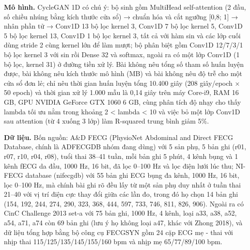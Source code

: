 \documentclass[12pt,a4paper]{article}
\begin{document}
\noindent \textbf{Mô hình.} CycleGAN 1D có chú ý: bộ sinh gồm MultiHead self-attention (2 đầu, số chiều nhúng bằng kích thước cửa sổ) → chuẩn hóa và cắt ngưỡng [0,8; 1] → nhân phần tử → Conv1D 13 bộ lọc kernel 3, Conv1D 7 bộ lọc kernel 5, Conv1D 5 bộ lọc kernel 13, Conv1D 1 bộ lọc kernel 3, tất cả với hàm sin và các lớp cuối dùng stride 2 cùng kernel lớn để làm mượt; bộ phân biệt gồm Conv1D 12/7/3/1 bộ lọc kernel 3 với sin rồi Dense 32 và softmax, ngoài ra có một lớp Conv1D (1 bộ lọc, kernel 31) ở đường tiền xử lý. Bài không nêu tổng số tham số huấn luyện được, bài không nêu kích thước mô hình (MB) và bài không nêu độ trễ cho một cửa sổ đơn lẻ; chỉ nêu thời gian huấn luyện tổng 10.400 giây (208 giây/epoch × 50 epoch) và thời gian xử lý 1.000 mẫu là 0,14 giây trên máy Core-i9, RAM 16 GB, GPU NVIDIA GeForce GTX 1060 6 GB, cùng phân tích độ nhạy cho thấy lambda tối ưu nằm trong khoảng 2 < lambda < 10 và việc bỏ một lớp Conv1D sau attention (từ 4 xuống 3 lớp) làm R-squared trung bình giảm 5\%.\par\vspace{3pt}
\noindent \textbf{Dữ liệu.} Bốn nguồn: A\&D FECG (PhysioNet Abdominal and Direct FECG Database, chính là ADFECGDB nhóm đang dùng) với 5 sản phụ, 5 bản ghi (r01, r07, r10, r04, r08), tuổi thai 38–41 tuần, mỗi bản ghi 5 phút, 4 kênh bụng và 1 kênh fECG da đầu, 1000 Hz, 16 bit, đã lọc 0–100 Hz và lọc điện lưới lúc thu; NI-FECG database (nifecgdb) với 55 bản ghi ECG bụng đa kênh, 1000 Hz, 16 bit, lọc 0–100 Hz, mà chính bài ghi rõ đều lấy từ một sản phụ duy nhất ở tuần thai 21–40 với vị trí điện cực thay đổi giữa các lần đo, trong đó họ chọn 14 bản ghi (154, 192, 244, 274, 290, 323, 368, 444, 597, 733, 746, 811, 826, 906). Ngoài ra có CinC Challenge 2013 set-a với 75 bản ghi, 1000 Hz, 4 kênh, loại a33, a38, a52, a54, a71, a74 còn 69 bản ghi (lưu ý họ không loại a47, khác với Zhong 2018), và dữ liệu tổng hợp bằng bộ công cụ FECGSYN gồm 24 cặp ECG mẹ - thai với nhịp thai 115/125/135/145/155/160 bpm và nhịp mẹ 65/77/89/100 bpm.\par\vspace{3pt}
\end{document}
